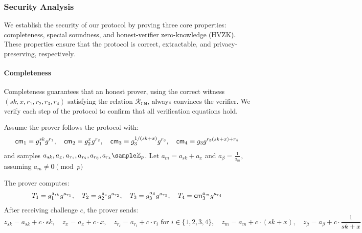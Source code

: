 \subsubsection{Security Analysis}
We establish the security of our protocol by proving three core properties: completeness, special soundness, and honest-verifier zero-knowledge (HVZK). These properties ensure that the protocol is correct, extractable, and privacy-preserving, respectively.

\paragraph{Completeness}
Completeness guarantees that an honest prover, using the correct witness $(sk, x, r_1, r_2, r_3, r_4)$ satisfying the relation $\mathcal{R}_{\mathsf{CN}}$, always convinces the verifier. We verify each step of the protocol to confirm that all verification equations hold.

Assume the prover follows the protocol with:
\[
\mathsf{cm}_1 = g_1^{sk} g^{r_1}, \quad \mathsf{cm}_2 = g_2^{x} g^{r_2}, \quad \mathsf{cm}_3 = g_3^{1/(sk + x)} g^{r_3}, \quad \mathsf{cm}_4 = g_3 g^{r_3 (sk + x) + r_4}
\]
and samples $a_{sk}, a_x, a_{r_1}, a_{r_2}, a_{r_3}, a_{r_4} \sample \mathbb{Z}_p$. Let $a_m = a_{sk} + a_x$ and $a_{\beta} = \frac{1}{a_m}$, assuming $a_m \neq 0 \pmod{p}$


The prover computes:
\[
T_1 = g_1^{a_{sk}} g^{a_{r_1}}, \quad T_2 = g_2^{a_x} g^{a_{r_2}}, \quad T_3 = g_3^{a_{\beta}} g^{a_{r_3}}, \quad T_4 = \mathsf{cm}_3^{a_m} g^{a_{r_4}}
\]
After receiving challenge $c$, the prover sends:
\[
z_{sk} = a_{sk} + c \cdot sk, \quad z_x = a_x + c \cdot x, \quad z_{r_i} = a_{r_i} + c \cdot r_i \text{ for } i \in \{1,2,3,4\}, \quad z_m = a_m + c \cdot (sk + x), \quad z_{\beta} = a_{\beta} + c \cdot \frac{1}{sk + x}
\]

